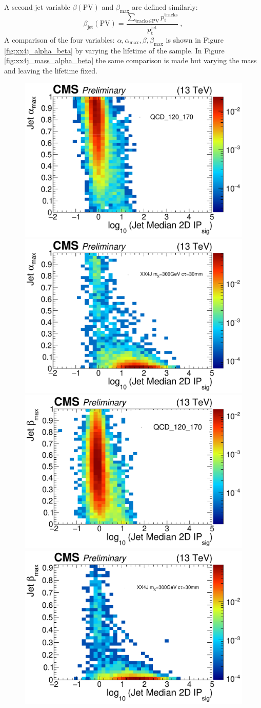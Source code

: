 A second jet variable $\beta(\textrm{PV})$ and $\beta_{\textrm{max}}$ are defined similarly:
\begin{equation}
\beta_{\textrm{jet}}(\textrm{PV}) = \frac{\sum_{\textrm{tracks} \in \textrm{PV}} p_{\textrm{t}}^{\textrm{tracks}}}{p_{\textrm{t}}^{\textrm{jet}}}~,
\end{equation}
A comparison of the four variables: $\alpha, \alpha_{\textrm{max}}, \beta, \beta_{\textrm{max}}$ is shown in 
Figure \ref{fig:xx4j_alpha_beta} by varying the lifetime of the sample. In Figure \ref{fig:xx4j_mass_alpha_beta} the same
comparison is made but varying the mass and leaving the lifetime fixed. 
\begin{figure}
\begin{center}
\includegraphics[width=.45\textwidth]{figures/an_jetid/VTX_MATCH_IP/QCD_2D_medianipsig_alpha}
\includegraphics[width=.45\textwidth]{figures/an_jetid/VTX_MATCH_IP/XX4J_2D_medianipsig_alpha}
\includegraphics[width=.45\textwidth]{figures/an_jetid/VTX_MATCH_IP/QCD_2D_medianipsig_beta}
\includegraphics[width=.45\textwidth]{figures/an_jetid/VTX_MATCH_IP/XX4J_2D_medianipsig_beta}

\end{center}
\end{figure}
